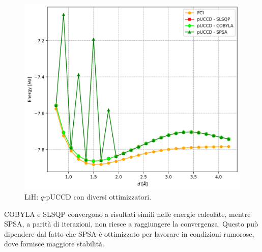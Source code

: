 \begin{figure}[H]
    \centering
    \hspace{-1cm}
    \includegraphics[width=.6\linewidth]{Immagini/Capitolo_3/LiH_optimizers.png}
    \caption{LiH: $q$-pUCCD con diversi ottimizzatori.}
    \label{fig:LiH-ottimizzatori}
\end{figure}

	
COBYLA e SLSQP convergono a risultati simili nelle energie calcolate, mentre SPSA, a parità di iterazioni, non riesce a raggiungere la convergenza. Questo può dipendere dal fatto che SPSA è ottimizzato per lavorare in condizioni rumorose, dove fornisce maggiore stabilità.





